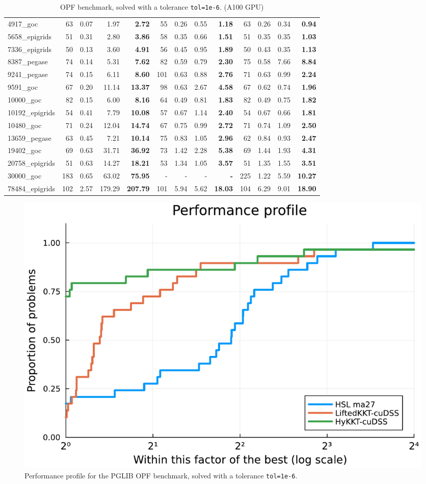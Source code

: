 \begin{table}[!ht]
{\begin{tabular}{|l|rrr >{\bfseries}r|rrr >{\bfseries}r|rrr >{\bfseries}r|}
      \hline
      4917\_goc & 63 & 0.07 & 1.97 & 2.72 & 55 & 0.26 & 0.55 & 1.18 & 63 & 0.26 & 0.34 & 0.94 \\
      5658\_epigrids & 51 & 0.31 & 2.80 & 3.86 & 58 & 0.35 & 0.66 & 1.51 & 51 & 0.35 & 0.35 & 1.03 \\
      7336\_epigrids & 50 & 0.13 & 3.60 & 4.91 & 56 & 0.45 & 0.95 & 1.89 & 50 & 0.43 & 0.35 & 1.13 \\
      8387\_pegase & 74 & 0.14 & 5.31 & 7.62 & 82 & 0.59 & 0.79 & 2.30 & 75 & 0.58 & 7.66 & 8.84 \\
      9241\_pegase & 74 & 0.15 & 6.11 & 8.60 & 101 & 0.63 & 0.88 & 2.76 & 71 & 0.63 & 0.99 & 2.24 \\
      \hline
      9591\_goc & 67 & 0.20 & 11.14 & 13.37 & 98 & 0.63 & 2.67 & 4.58 & 67 & 0.62 & 0.74 & 1.96 \\
      10000\_goc & 82 & 0.15 & 6.00 & 8.16 & 64 & 0.49 & 0.81 & 1.83 & 82 & 0.49 & 0.75 & 1.82 \\
      10192\_epigrids & 54 & 0.41 & 7.79 & 10.08 & 57 & 0.67 & 1.14 & 2.40 & 54 & 0.67 & 0.66 & 1.81 \\
      10480\_goc & 71 & 0.24 & 12.04 & 14.74 & 67 & 0.75 & 0.99 & 2.72 & 71 & 0.74 & 1.09 & 2.50 \\
      13659\_pegase & 63 & 0.45 & 7.21 & 10.14 & 75 & 0.83 & 1.05 & 2.96 & 62 & 0.84 & 0.93 & 2.47 \\
      \hline
      19402\_goc & 69 & 0.63 & 31.71 & 36.92 & 73 & 1.42 & 2.28 & 5.38 & 69 & 1.44 & 1.93 & 4.31 \\
      20758\_epigrids & 51 & 0.63 & 14.27 & 18.21 & 53 & 1.34 & 1.05 & 3.57 & 51 & 1.35 & 1.55 & 3.51 \\
      30000\_goc & 183 & 0.65 & 63.02 & 75.95 & - & - & - & - & 225 & 1.22 & 5.59 & 10.27 \\
      78484\_epigrids & 102 & 2.57 & 179.29 & 207.79 & 101 & 5.94 & 5.62 & 18.03 & 104 & 6.29 & 9.01 & 18.90 \\
      \hline
    \end{tabular}
  }
  \caption{OPF benchmark, solved with a tolerance {\tt tol=1e-6}. (A100 GPU) \label{tab:opf:benchmark}}
\end{table}

\begin{figure}[!ht]
  \centering
  \includegraphics[width=.6\textwidth]{../figures/pprof-cuda.pdf}
  \caption{Performance profile for the PGLIB OPF benchmark, solved
    with a tolerance {\tt tol=1e-6}.
  \label{fig:opf:pprof}}
\end{figure}

